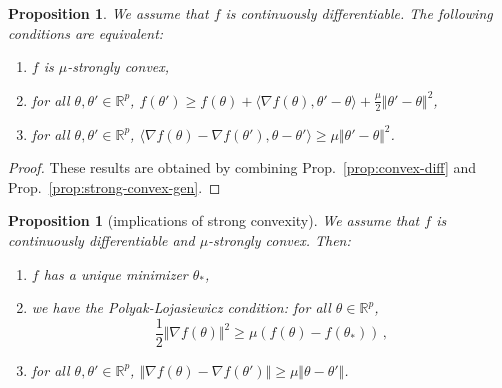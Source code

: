 \documentclass[11pt,reqno]{article}
\newcommand{\R}{\mathbb{R}}
\renewcommand{\geq}{\geqslant}
\numberwithin{equation}{section}
\theoremstyle{plain}
\newtheorem{proposition}[assumption]{Proposition}
\theoremstyle{definition}
\theoremstyle{remark}
\begin{document}
\begin{proposition}
	\label{prop:strong-convex-diff}
	We assume that $f$ is continuously differentiable. The following conditions are equivalent:
	\begin{enumerate}[label=(\roman*)]
		\item $f$ is $\mu$-strongly convex,
		\item for all $\theta, \theta' \in \R^p$,
		$f(\theta') \geq f(\theta) + \langle \nabla f(\theta),  \theta' - \theta \rangle + \frac{\mu}{2}\Vert \theta' - \theta \Vert^2$,
		\item for all $\theta, \theta' \in \R^p$, $\langle \nabla f(\theta) - \nabla f(\theta'), \theta - \theta' \rangle \geq \mu\Vert \theta' - \theta \Vert^2$.
	\end{enumerate}
\end{proposition}

\begin{proof}
	These results are obtained by combining Prop.~\ref{prop:convex-diff} and Prop.~\ref{prop:strong-convex-gen}.
\end{proof}

\begin{proposition}[implications of strong convexity]
	We assume that $f$ is continuously differentiable and $\mu$-strongly convex. Then:
	\begin{enumerate}[label=(\roman*)]
		\item $f$ has a unique minimizer $\theta_*$,
		\item we have the \emph{Polyak-Lojasiewicz condition}: for all $\theta \in \R^p$,
		\begin{equation*}
		\frac{1}{2} \Vert \nabla f(\theta) \Vert^2 \geq \mu \left(f(\theta) - f(\theta_*)\right) \, ,
		\end{equation*}
		\item for all $\theta, \theta' \in \R^p$, $\Vert \nabla f(\theta) - \nabla f(\theta') \Vert \geq \mu \Vert \theta - \theta' \Vert$.
	\end{enumerate}
\end{proposition}
\end{document}
